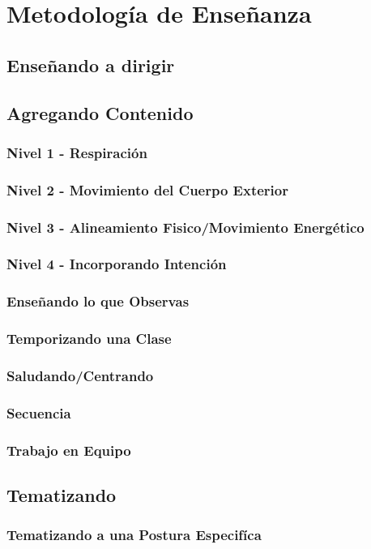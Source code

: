 \documentclass[a4paper]{book}
\begin{document}
\section{Metodología de Enseñanza}
\subsection{Enseñando a dirigir}
\subsection{Agregando Contenido}
\subsubsection{Nivel 1 - Respiración}
\subsubsection{Nivel 2 - Movimiento del Cuerpo Exterior}
\subsubsection{Nivel 3 - Alineamiento Fisico/Movimiento Energético}
\subsubsection{Nivel 4 - Incorporando Intención}
\subsubsection{Enseñando lo que Observas}
\subsubsection{Temporizando una Clase}
\subsubsection{Saludando/Centrando}
\subsubsection{Secuencia}
\subsubsection{Trabajo en Equipo}
\subsection{Tematizando}
\subsubsection{Tematizando a una Postura Especifíca}
\end{document}
